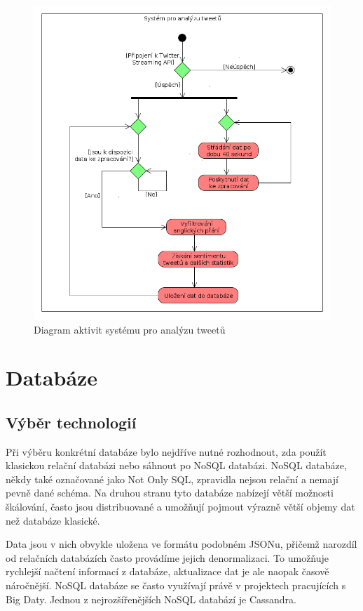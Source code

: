 \documentclass[thesis=B,czech]{FITthesis}[2012/06/26]
\begin{document}
	
\begin{figure}[h]
   	\centering
   	\includegraphics[width=1\textwidth]{images/activity-diagram.png}
   	\caption{Diagram aktivit systému pro analýzu tweetů}
   	\label{fig:activity_diagram}
\end{figure}

\section{Databáze}
\subsection{Výběr technologií}
	Při výběru konkrétní databáze bylo nejdříve nutné rozhodnout, zda použít klasickou relační databázi nebo sáhnout po NoSQL databázi. NoSQL databáze, někdy také označované jako Not Only SQL, zpravidla nejsou relační a nemají pevně dané schéma. Na druhou stranu tyto databáze nabízejí větší možnosti škálování, často jsou distribuované a umožňují pojmout výrazně větší objemy dat než databáze klasické\cite{nosql-dbs}. 
	
	Data jsou v nich obvykle uložena ve formátu podobném JSONu, přičemž narozdíl od relačních databázích často provádíme jejich denormalizaci. To umožňuje rychlejší načtení informací z databáze, aktualizace dat je ale naopak časově náročnější. NoSQL databáze se často využívají právě v projektech pracujících s Big Daty. Jednou z nejrozšířenějších NoSQL databází je Cassandra. 
	
\end{document}

